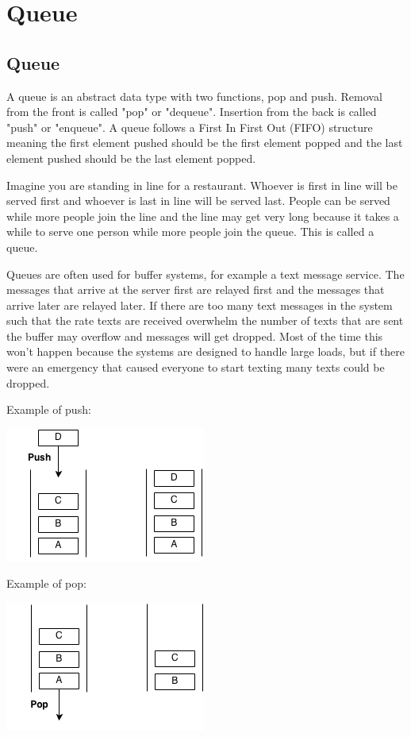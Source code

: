 \documentclass[11pt,oneside]{book}
\makeatletter
\def\maxwidth#1{\ifdim\Gin@nat@width>#1 #1\else\Gin@nat@width\fi}
\makeatother
\begin{document}
    \chapter{ Queue }
        \section{ Queue }
        

A queue is an abstract data type with two functions, pop and push. Removal from the front is called "pop" or "dequeue". Insertion from the back is called "push" or "enqueue". A queue follows a First In First Out (FIFO) structure meaning the first element pushed should be the first element popped and the last element pushed should be the last element popped.

Imagine you are standing in line for a restaurant. Whoever is first in line will be served first and whoever is last in line will be served last. People can be served while more people join the line and the line may get very long because it takes a while to serve one person while more people join the queue. This is called a queue.

Queues are often used for buffer systems, for example a text message service. The messages that arrive at the server first are relayed first and the messages that arrive later are relayed later. If there are too many text messages in the system such that the rate  texts are received overwhelm the number of texts that are sent the buffer may overflow and messages will get dropped. Most of the time this won't happen because the systems are designed to handle large loads, but if there were an emergency that caused everyone to start texting many texts could be dropped.

Example of push:

\includegraphics[width=\maxwidth{\textwidth}]{queue.png}

Example of pop:

\includegraphics[width=\maxwidth{\textwidth}]{queue2.png}
\end{document}
